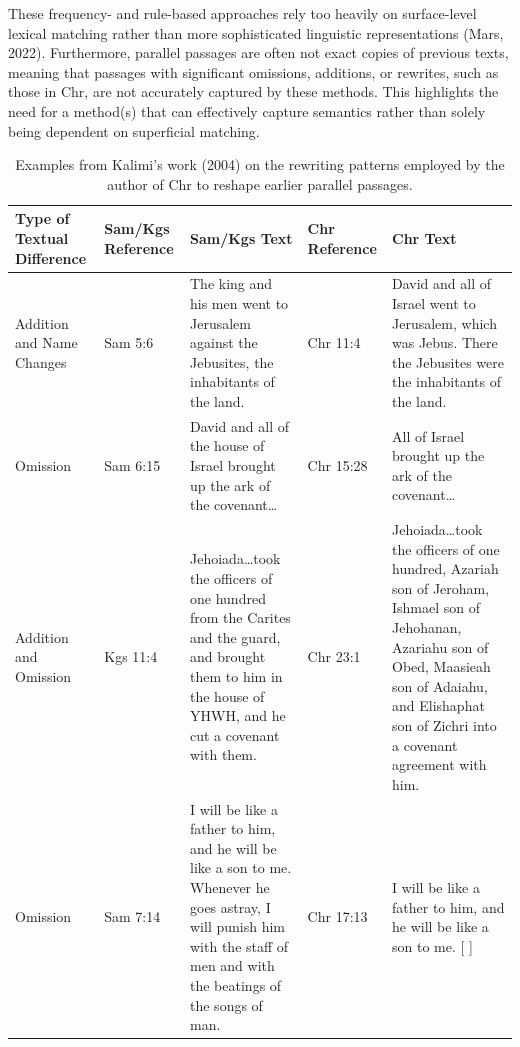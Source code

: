 \documentclass[12pt]{article}
\begin{document}
These frequency- and rule-based approaches rely too heavily on surface-level lexical matching rather than more sophisticated linguistic representations (Mars, 2022). Furthermore, parallel passages are often not exact copies of previous texts, meaning that passages with significant omissions, additions, or rewrites, such as those in Chr, are not accurately captured by these methods. This highlights the need for a method(s) that can effectively capture semantics rather than solely being dependent on superficial matching.

\begin{table}[htbp]
\centering
\label{tab:kalimi}
\begin{tabularx}{\textwidth}{
  @{}>{\raggedright\arraybackslash}p{2cm}
     >{\raggedright\arraybackslash}p{1.8cm}
     >{\raggedright\arraybackslash}X
     >{\raggedright\arraybackslash}p{1.8cm}
     >{\raggedright\arraybackslash}X@{}
}
\toprule
\textbf{Type of Textual Difference} 
 & \textbf{Sam/Kgs Reference} 
 & \textbf{Sam/Kgs Text} 
 & \textbf{Chr Reference} 
 & \textbf{Chr Text} \\
\midrule
Addition and Name Changes 
 & 2 Sam 5:6 
 & The king and his men went to Jerusalem against the Jebusites, the inhabitants of the land.
 & 1 Chr 11:4
 & David and all of Israel went to Jerusalem, which was Jebus. There the Jebusites were the inhabitants of the land. \\[1ex]

Omission 
 & 2 Sam 6:15 
 & David and all of the house of Israel brought up the ark of the covenant\ldots 
 & 1 Chr 15:28 
 & [ ] All of Israel brought up the ark of the covenant\ldots \\[1ex]

Addition and Omission 
 & 2 Kgs 11:4 
 & Jehoiada\ldots took the officers of one hundred from the Carites and the guard, and brought them to him in the house of YHWH, and he cut a covenant with them.
 & 2 Chr 23:1
 & Jehoiada\ldots took the officers of one hundred, Azariah son of Jeroham, Ishmael son of Jehohanan, Azariahu son of Obed, Maasieah son of Adaiahu, and Elishaphat son of Zichri into a covenant agreement with him. \\[1ex]

Omission 
 & 2 Sam 7:14 
 & I will be like a father to him, and he will be like a son to me. Whenever he goes astray, I will punish him with the staff of men and with the beatings of the songs of man.
 & 1 Chr 17:13
 & I will be like a father to him, and he will be like a son to me. [ ] \\
\bottomrule
\end{tabularx}
\caption{Examples from Kalimi's work (2004) on the rewriting patterns employed by the author of Chr to reshape earlier parallel passages.}
\end{table}
\end{document}
